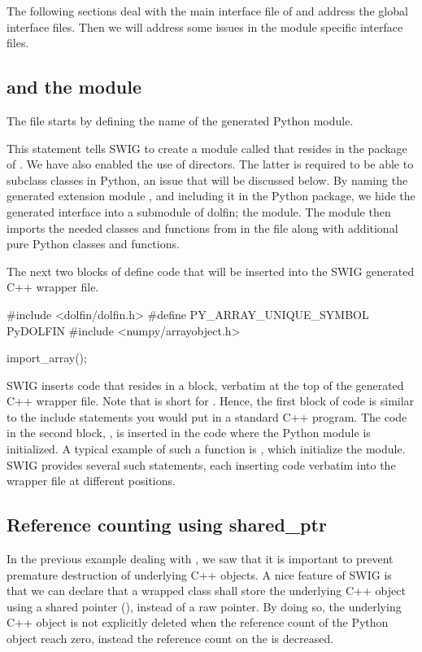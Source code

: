 The following sections deal with the main
interface file of  and address the global interface files. Then we will address some issues in the module specific interface files.

\subsection{ and the  module}
The file  starts by defining the name of the generated Python module.
\begin{swigcode}
\end{swigcode}
This statement tells SWIG to create a module called  that resides
in the package of . We have also enabled the use of directors.
The latter is required to be able to subclass \dolfin classes in Python,
an issue that will be discussed below.  By naming the generated extension module
, and including it in the  Python package, we hide the generated interface into a submodule of dolfin; the  module. 
The  module then imports the needed classes and functions 
from  in the  file along with additional pure Python classes and functions.

The next two blocks of  define code that will be inserted into the SWIG generated C++ wrapper file.
\begin{swigcode}
#include <dolfin/dolfin.h>
#define PY_ARRAY_UNIQUE_SYMBOL PyDOLFIN
#include <numpy/arrayobject.h>

import_array();
\end{swigcode}
SWIG inserts code that resides in a \emp{\%\{$\ldots$\}\%} block, verbatim
at the top of the generated C++ wrapper file. Note that
\emp{\%\{$\ldots$\}\%} is short for . Hence,
the first block of code is similar to the include statements you would
put in a standard C++ program. The code in the second block,
, is inserted in the code where the Python
module is initialized. A typical example of such a function is
, which initialize the \numpy module. SWIG provides
several such statements, each inserting code verbatim into the wrapper file
at different positions.


\subsection{Reference counting using shared\_ptr}
In the previous example dealing with , we saw that it is
important to prevent premature destruction of underlying C++ objects. A
nice feature of SWIG is that we can declare that a wrapped class shall
store the underlying C++ object using a shared pointer (), instead of a raw
pointer. By doing so, the underlying C++ object is not explicitly deleted
when the reference count of the Python object reach zero, instead the
reference count on the  is decreased.


